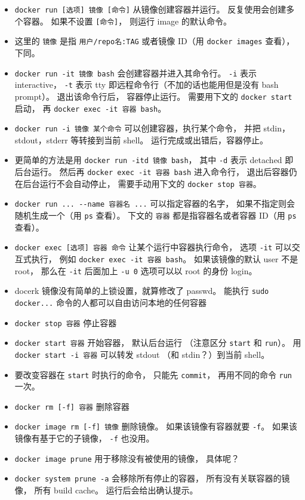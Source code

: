\begin{itemize}
\item \verb|docker run [选项] 镜像 [命令]| 从镜像创建容器并运行。 反复使用会创建多个容器。 如果不设置 \verb|[命令]|， 则运行 image 的默认命令。
\item 这里的 \verb|镜像| 是指 \verb|用户/repo名:TAG| 或者镜像 ID（用 \verb|docker images| 查看）， 下同。
\item \verb|docker run -it 镜像 bash| 会创建容器并进入其命令行。 \verb|-i| 表示 interactive， \verb|-t| 表示 tty 即远程命令行（不加的话也能用但是没有 bash prompt）。 退出该命令行后， 容器停止运行。 需要用下文的 \verb|docker start| 启动， 再 \verb|docker exec -it 容器 bash|。
\item \verb|docker run -i 镜像 某个命令| 可以创建容器，执行某个命令， 并把 stdin，stdout，stderr 等转接到当前 shell。 运行完成或出错后，容器停止。
\item 更简单的方法是用 \verb|docker run -itd 镜像 bash|， 其中 \verb|-d| 表示 detached 即后台运行。 然后再 \verb|docker exec -it 容器 bash| 进入命令行， 退出后容器仍在后台运行不会自动停止， 需要手动用下文的 \verb|docker stop 容器|。
\item \verb|docker run ... --name 容器名 ...| 可以指定容器的名字， 如果不指定则会随机生成一个（用 \verb|ps| 查看）。 下文的 \verb|容器| 都是指容器名或者容器 ID（用 \verb|ps| 查看）。
\item \verb`docker exec [选项] 容器 命令` 让某个运行中容器执行命令， 选项 \verb|-it| 可以交互式执行， 例如 \verb|docker exec -it 容器 bash|。 如果该镜像的默认 user 不是 root， 那么在 \verb|-it| 后面加上 \verb|-u 0| 选项可以以 root 的身份 login。
\item docerk 镜像没有简单的上锁设置，就算修改了 passwd。 能执行 \verb`sudo docker...` 命令的人都可以自由访问本地的任何容器
\item \verb`docker stop 容器` 停止容器
\item \verb`docker start 容器` 开始容器， 默认后台运行 （注意区分 \verb|start| 和 \verb|run|）。 用 \verb|docker start -i 容器| 可以转发 stdout （和 stdin？）到当前 shell。
\item 要改变容器在 \verb|start| 时执行的命令， 只能先 \verb|commit|， 再用不同的命令 \verb|run| 一次。
\item \verb`docker rm [-f] 容器` 删除容器
\item \verb`docker image rm [-f] 镜像` 删除镜像。 如果该镜像有容器就要 \verb|-f|。 如果该镜像有基于它的子镜像， \verb|-f| 也没用。
\item \verb|docker image prune| 用于移除没有被使用的镜像， 具体呢？
\item \verb|docker system prune -a| 会移除所有停止的容器， 所有没有关联容器的镜像， 所有 build cache。 运行后会给出确认提示。

\end{itemize}
